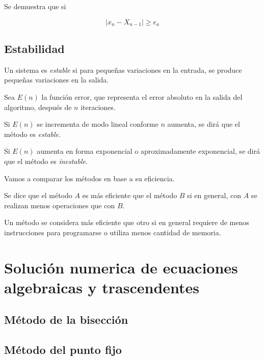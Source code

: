 \documentclass{memoir}
\begin{document}
Se demuestra que si

\[ |x_n - X_{n-1}|\ge e_a \]

\section{Estabilidad}
Un sistema es \emph{estable} si para pequeñas variaciones en la entrada, se produce pequeñas variaciones en la salida.

Sea $E(n)$ la función error, que representa el error absoluto en la salida del algoritmo, después de $n$ iteraciones.

Si $E(n)$ se incrementa de modo lineal conforme $n$ aumenta, se dirá que el método es \textit{estable}.

Si $E(n)$ aumenta en forma exponencial o aproximadamente exponencial, se dirá que el método es \textit{inestable}.


Vamos a comparar los métodos en base a su eficiencia.

Se dice que el método $A$ es más eficiente que el método $B$ si en general, con $A$ se realizan menos operaciones que con $B$.

Un método se considera más eficiente que otro si en general requiere de menos instrucciones para programarse o utiliza menos cantidad de memoria.

\chapter{Solución numerica de ecuaciones algebraicas y trascendentes}

\section{Método de la bisección}

\section{Método del punto fijo}
\end{document}
